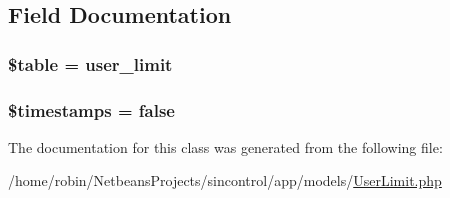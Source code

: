 \subsection{Field Documentation}
\hypertarget{class_user_limit_ae8876a14058f368335baccf35af4a22b}{}
\subsubsection[{\$table}]{\setlength{\rightskip}{0pt plus 5cm}\$table = \textquotesingle{}user\+\_\+limit\textquotesingle{}\hspace{0.3cm}{\ttfamily [protected]}}\label{class_user_limit_ae8876a14058f368335baccf35af4a22b}
\hypertarget{class_user_limit_a51267c24c8fae742ed8f9be0ba6085ee}{}
\subsubsection[{\$timestamps}]{\setlength{\rightskip}{0pt plus 5cm}\$timestamps = false}\label{class_user_limit_a51267c24c8fae742ed8f9be0ba6085ee}


The documentation for this class was generated from the following file\+:\begin{DoxyCompactItemize}
\item 
/home/robin/\+Netbeans\+Projects/sincontrol/app/models/\hyperlink{_user_limit_8php}{User\+Limit.\+php}\end{DoxyCompactItemize}

